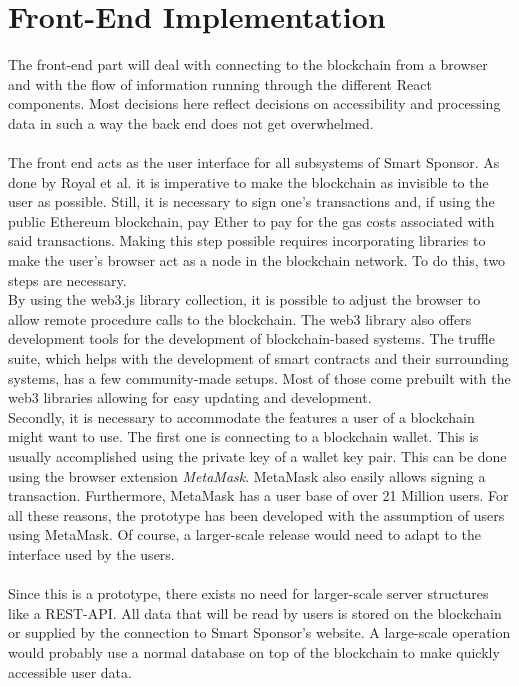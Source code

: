 \section{Front-End Implementation}
The front-end part will deal with connecting to the blockchain from a browser and with the flow of information running through the different React components. Most decisions here reflect decisions on accessibility and processing data in such a way the back end does not get overwhelmed.\\
\\
The front end acts as the user interface for all subsystems of Smart Sponsor. As done by Royal et al.\cite{royal} it is imperative to make the blockchain as invisible to the user as possible. Still, it is necessary to sign one's transactions and, if using the public Ethereum blockchain, pay Ether to pay for the gas costs associated with said transactions. Making this step possible requires incorporating libraries to make the user's browser act as a node in the blockchain network. To do this, two steps are necessary.\\
By using the web3.js library\cite{web3} collection, it is possible to adjust the browser to allow remote procedure calls to the blockchain. The web3 library also offers development tools for the development of blockchain-based systems. The truffle suite, which helps with the development of smart contracts and their surrounding systems, has a few community-made setups. Most of those come prebuilt with the web3 libraries allowing for easy updating and development.\\
Secondly, it is necessary to accommodate the features a user of a blockchain might want to use. The first one is connecting to a blockchain wallet. This is usually accomplished using the private key of a wallet key pair. This can be done using the browser extension \emph{MetaMask}\cite{meta}. MetaMask also easily allows signing a transaction. Furthermore, MetaMask has a user base of over 21 Million users\cite{metastat}. For all these reasons, the prototype has been developed with the assumption of users using MetaMask. Of course, a larger-scale release would need to adapt to the interface used by the users.\\
\\
Since this is a prototype, there exists no need for larger-scale server structures like a REST-API. All data that will be read by users is stored on the blockchain or supplied by the connection to Smart Sponsor's website. A large-scale operation would probably use a normal database on top of the blockchain to make quickly accessible user data.\\

